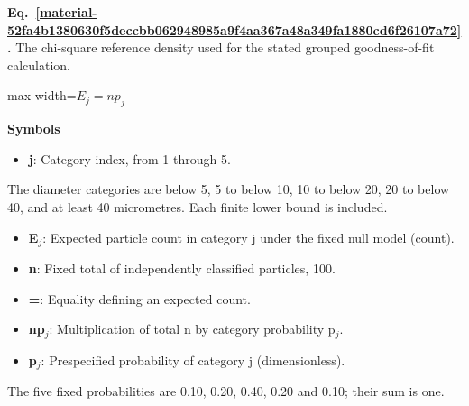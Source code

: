 \documentclass[11pt,a4paper]{article}
\begin{document}
\par\medskip
\begin{samepage}
\label{material-52fa4b1380630f5deccbb062948985a9f4aa367a48a349fa1880cd6f26107a72}
\noindent\textbf{Eq.~\ref*{material-52fa4b1380630f5deccbb062948985a9f4aa367a48a349fa1880cd6f26107a72}.} The chi-square reference density used for the stated grouped goodness-of-fit calculation.\par\nopagebreak
\begin{center}\begin{adjustbox}{max width=\linewidth}$\displaystyle E_j=n p_j$\end{adjustbox}\end{center}

\par\noindent\textbf{Symbols}

\begin{itemize}\setlength{\itemsep}{1pt}\setlength{\parsep}{0pt}
\item \textbf{j}: Category index, from 1 through 5.
\end{itemize}

The diameter categories are below 5, 5 to below 10, 10 to below 20, 20 to below 40, and at least 40 micrometres. Each finite lower bound is included.

\begin{itemize}\setlength{\itemsep}{1pt}\setlength{\parsep}{0pt}
\item \textbf{E\ensuremath{{}_j}}: Expected particle count in category j under the fixed null model (count).
\end{itemize}

\begin{itemize}\setlength{\itemsep}{1pt}\setlength{\parsep}{0pt}
\item \textbf{n}: Fixed total of independently classified particles, 100.
\item \textbf{=}: Equality defining an expected count.
\item \textbf{np\ensuremath{{}_j}}: Multiplication of total n by category probability p\ensuremath{{}_j}.
\end{itemize}

\begin{itemize}\setlength{\itemsep}{1pt}\setlength{\parsep}{0pt}
\item \textbf{p\ensuremath{{}_j}}: Prespecified probability of category j (dimensionless).
\end{itemize}

The five fixed probabilities are 0.10, 0.20, 0.40, 0.20 and 0.10; their sum is one.

\end{samepage}
\medskip
\end{document}
